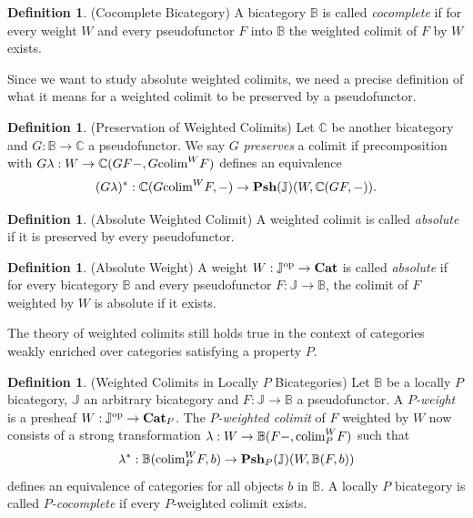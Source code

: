 \documentclass[12pt,oneside,reqno,a4paper]{article}
\theoremstyle{definition}
\newtheorem{definition}[theorem]{Definition}
\newcommand{\op}{^\textup{op}}
\newcommand{\Cat}{\textbf{\textup{Cat}}}
\newcommand{\Psh}[1]{\textbf{\textup{Psh}}(#1)}
\newcommand{\PshP}[1]{\textbf{\textup{Psh}}_{P}(#1)}
\newcommand{\bB}{\mathbb{B}}
\newcommand{\bC}{\mathbb{C}}
\newcommand{\bJ}{\mathbb{J}}
\newcommand{\colim}{\textup{colim}}
\begin{document}
\begin{definition}{(Cocomplete Bicategory)}
A bicategory $\bB$ is called \textit{cocomplete} if for every weight $W$ and every pseudofunctor $F$ into $\bB$ the weighted colimit of $F$ by $W$ exists.
\end{definition}

Since we want to study absolute weighted colimits, we need a precise definition of what it means for a weighted  colimit to be preserved by a pseudofunctor.

\begin{definition}{(Preservation of Weighted Colimits)}
Let $\bC$ be another bicategory and $G:\bB\to\bC$ a pseudofunctor. We say $G$ \textit{preserves} a colimit if precomposition with $G\lambda:W\to \bC(GF-,G\colim^W F)$ defines an equivalence
\begin{align*}
(G\lambda)^*:\bC(G\colim^W F,-)\to\Psh{\bJ}(W,\bC(GF,-)).
\end{align*}
\end{definition}

\begin{definition}{(Absolute Weighted Colimit)}
A weighted colimit is called \textit{absolute} if it is preserved by every pseudofunctor.
\end{definition}

\begin{definition}{(Absolute Weight)}
A weight $W:\bJ\op\to\Cat$ is called \textit{absolute} if for every bicategory $\bB$ and every pseudofunctor $F:\bJ\to\bB$, the colimit of $F$ weighted by $W$ is absolute if it exists.
\end{definition}

The theory of weighted colimits still holds true in the context of categories weakly enriched over categories satisfying a property $P$.

\begin{definition}{(Weighted Colimits in Locally $P$ Bicategories)} \label{lPcolim}
Let $\bB$ be a locally $P$ bicategory, $\bJ$ an arbitrary bicategory and $F:\bJ\to\bB$ a pseudofunctor. A \textit{$P$-weight} is a presheaf $W:\bJ\op\to\Cat_P$. The \textit{$P$-weighted colimit} of $F$ weighted by $W$ now consists of a strong transformation $\lambda:W\to\bB(F-,\colim_P^W F)$ such that
\begin{align*}
\lambda^*:\bB(\colim_P^W F,b)\to\PshP{\bJ}(W,\bB(F,b))
\end{align*}
defines an equivalence of categories for all objects $b$ in $\bB$. A locally $P$ bicategory is called \textit{$P$-cocomplete} if every $P$-weighted colimit exists.
\end{definition}
\end{document}
